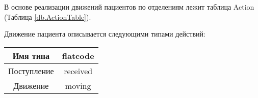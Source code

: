 \documentclass[a4paper,14pt]{report} %
\begin{document}
 
 В основе реализации движений пациентов по отделениям лежит таблица Action (Таблица \ref{db.ActionTable}).
 {\scriptsize }

 Движение пациента описывается следующими типами действий: \\
 \begin{table}[h]
 \begin{tabular}{|c|c|}
 \hline
 Имя типа & flatcode \\
 \hline
 Поступление & received \\
 Движение & moving \\
 \hline
 \end{tabular}
 \end{table}
 
\end{document}

